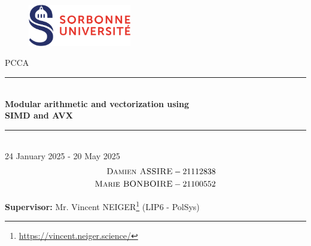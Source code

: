 \documentclass[a4paper]{article}
\begin{document}
\thispagestyle{plain}
\begin{titlepage}
    \begin{figure}[h]
        \centering
        \includegraphics[width=0.4\textwidth]{su.png}
    \end{figure}
    \vspace{1cm}

    \begin{center}
        {\LARGE PCCA}\\[0.3cm]
        \rule{\linewidth}{0.5mm} \\[0.4cm]
        {\huge \textbf{Modular arithmetic and vectorization using\\ SIMD and AVX}}\\[0.4cm]
        \rule{\linewidth}{0.5mm} \\[1cm]
        {\large 24 January 2025 - 20 May 2025}\\[3cm]

        {\Large 
            \begin{align*}
                \textsc{Damien ASSIRE}  &- 21112838 \\
                \textsc{Marie BONBOIRE} &- 21100552
            \end{align*}
        }


    \end{center}

    \vfill
\begin{flushleft}{\large
    \textbf{Supervisor:} Mr. Vincent NEIGER\footnote{\url{https://vincent.neiger.science/}} (LIP6 - PolSys)\\
    }
\end{flushleft}
\end{titlepage}
\newpage

\tableofcontents
\newpage
\end{document}
